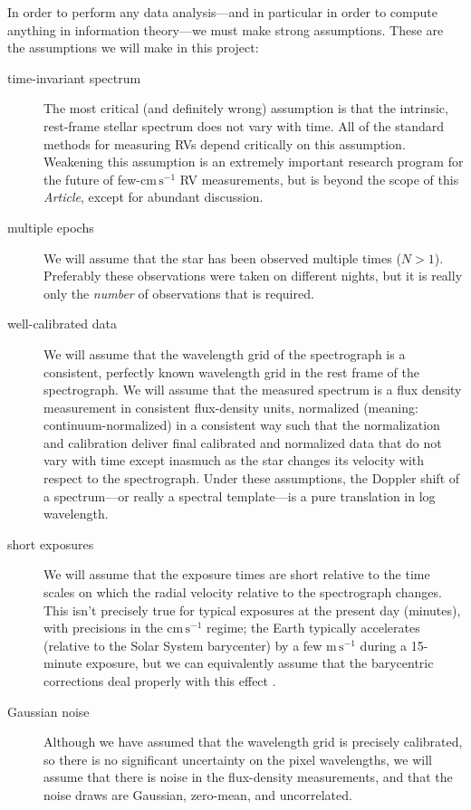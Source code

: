 \documentclass[modern]{aastex631}
\newcommand{\unit}[1]{\mathrm{#1}}
\newcommand{\m}{\unit{m}}
\newcommand{\cm}{\unit{cm}}
\newcommand{\s}{\unit{s}}
\newcommand{\cmps}{\cm\,\s^{-1}}
\newcommand{\mps}{\m\,\s^{-1}}
\newcommand{\documentname}{\textsl{Article}}
\begin{document}
In order to perform any data analysis---and in particular in order to compute anything in information theory---we must make strong assumptions.
These are the assumptions we will make in this project:
\begin{description}
    \item[time-invariant spectrum]
    The most critical (and definitely wrong) assumption is that the intrinsic, rest-frame stellar spectrum does not vary with time.
    All of the standard methods for measuring RVs depend critically on this assumption.
    Weakening this assumption is an extremely important research program for the future of few-$\cmps$ RV measurements, but is beyond the scope of this \documentname, except for abundant discussion.
    \item[multiple epochs]
    We will assume that the star has been observed multiple times ($N>1$). Preferably these observations were taken on different nights, but it is really only the \emph{number} of observations that is required.
    \item[well-calibrated data]
    We will assume that the wavelength grid of the spectrograph is a consistent, perfectly known wavelength grid in the rest frame of the spectrograph.
    We will assume that the measured spectrum is a flux density measurement in consistent flux-density units, normalized (meaning: continuum-normalized) in a consistent way such that the normalization and calibration deliver final calibrated and normalized data that do not vary with time except inasmuch as the star changes its velocity with respect to the spectrograph.
    Under these assumptions, the Doppler shift of a spectrum---or really a spectral template---is a pure translation in log wavelength. 
    \item[short exposures]
    We will assume that the exposure times are short relative to the time scales on which the radial velocity relative to the spectrograph changes.
    This isn't precisely true for typical exposures at the present day (minutes), with precisions in the $\cmps$ regime; the Earth typically accelerates (relative to the Solar System barycenter) by a few $\mps$ during a 15-minute exposure, but we can equivalently assume that the barycentric corrections deal properly with this effect \citep{berv-lambda}.
    \item[Gaussian noise]
    Although we have assumed that the wavelength grid is precisely calibrated, so there is no significant uncertainty on the pixel wavelengths, we will assume that there is noise in the flux-density measurements, and that the noise draws are Gaussian, zero-mean, and uncorrelated.

\end{description}
\end{document}
